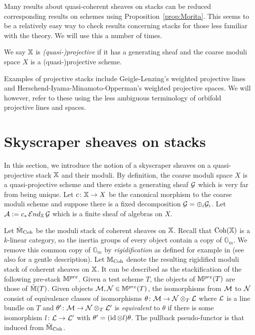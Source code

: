 \documentclass[12pt]{amsart}
\begin{document}
\begin{remark}  \label{rem:Morita}
Many results about quasi-coherent sheaves on stacks can be reduced corresponding results on schemes using Proposition~\ref{prop:Morita}. This seems to be a relatively easy way to check results concerning stacks for those less familiar with the theory. We will use this a number of times.
\end{remark}

\begin{definition}
We say $\mathbb{X}$ is {\em (quasi-)projective} if it has a generating sheaf and the coarse moduli space $X$ is a (quasi-)projective scheme.
\end{definition}

Examples of projective stacks include Geigle-Lenzing's weighted projective lines \cite{GL} and Herschend-Iyama-Minamoto-Opperman's weighted projective spaces. We will however, refer to these using the less ambiguous terminology of orbifold projective lines and spaces. 



\section{Skyscraper sheaves on stacks}
\label{sec:sky}

In this section, we introduce the notion of a skyscraper sheaves on a quasi-projective stack $\mathbb{X}$ and their moduli. By definition, the coarse moduli space $X$ is a quasi-projective scheme and there exists a generating sheaf $\mathcal{G}$ which is very far from being unique. Let $c \colon \mathbb{X} \rightarrow X$ be the canonical morphism to the coarse moduli scheme and suppose there is a fixed decomposition $\mathcal{G} = \oplus_i \mathcal{G}_i$. Let $\mathcal{A} := c_* \mathop{{\mathcal{E}}nd}\nolimits_{\mathbb{X}} \mathcal{G}$ which is a finite sheaf of algebras on $X$.

Let $\tilde{\mathbb{M}}_{\operatorname{Coh}}$ be the moduli stack of coherent sheaves on $\mathbb{X}$. Recall that $\operatorname{Coh}(\mathbb{X})$ is a $k$-linear category, so the inertia groups of every object contain a copy of $\mathbb{G}_m$. We remove this common copy of $\mathbb{G}_m$ by {\em rigidification} as defined for example in \cite[Section~5]{ACV} (see also \cite[Section~2.3]{CL} for a gentle description). Let $\mathbb{M}_{\operatorname{Coh}}$ denote the resulting rigidified moduli stack of coherent sheaves on $\mathbb{X}$. It can be described as the stackification of the following pre-stack $\mathbb{M}^{pre}$. Given a test scheme $T$, the objects of $\mathbb{M}^{pre}(T)$ are those of $\tilde{\mathbb{M}}(T)$. Given objects $\mathcal{M}, \mathcal{N} \in \mathbb{M}^{pre}(T)$, the isomorphisms from $\mathcal{M}$ to $\mathcal{N}$ consist of equivalence classes of isomorphisms $\theta \colon \mathcal{M} \to \mathcal{N} \otimes_T \mathcal{L}$ where $\mathcal{L}$ is a line bundle on $T$ and $\theta' \colon \mathcal{M} \to \mathcal{N} \otimes_T \mathcal{L}'$ is {\em equivalent} to $\theta$ if there is some isomorphism $l \colon \mathcal{L} \to \mathcal{L}'$ with $\theta' = (\operatorname{id} \otimes l) \theta$. The pullback pseudo-functor is that induced from $\tilde{\mathbb{M}}_{\operatorname{Coh}}$. 
\end{document}
